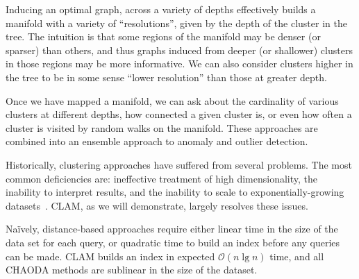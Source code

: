 Inducing an optimal graph, across a variety of depths effectively builds a manifold with a variety of ``resolutions'', given by the depth of the cluster in the tree. The intuition is that some regions of the manifold may be denser (or sparser) than others, and thus graphs induced from deeper (or shallower) clusters in those regions may be more informative.
We can also consider clusters higher in the tree to be in some sense ``lower resolution'' than those at greater depth.

Once we have mapped a manifold, we can ask about the cardinality of various clusters at different depths, how connected a given cluster is, or even how often a cluster is visited by random walks on the manifold.
These approaches are combined into an ensemble approach to anomaly and outlier detection.


Historically, clustering approaches have suffered from several problems.
The most common deficiencies are: ineffective treatment of high dimensionality, the inability to interpret results, and the inability to scale to exponentially-growing datasets~\cite{agrawal1998automatic}.
CLAM, as we will demonstrate, largely resolves these issues.

Na\"ively, distance-based approaches require either linear time in the size of the data set for each query,
or quadratic time to build an index before any queries can be made.
CLAM builds an index in expected $\mathcal{O}(n \lg n)$ time, and all CHAODA methods are sublinear in the size of the dataset.
